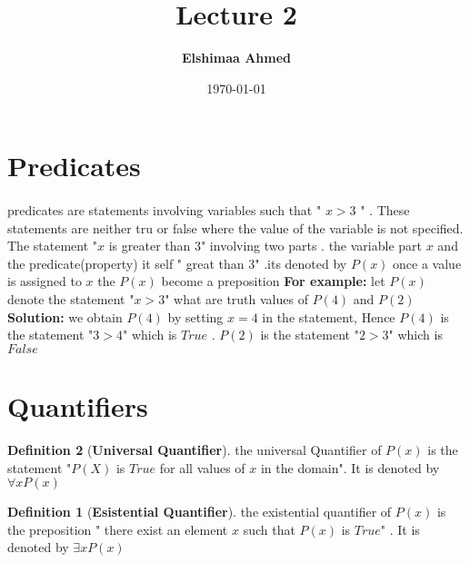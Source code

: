 \documentclass[a4paper]{article}
\begin{document}
\author{\textbf{Elshimaa Ahmed}}
\title{\textbf{Lecture 2}}
\date {\today}
\maketitle
\theoremstyle{definition}
\newtheorem{definition}{Definition}[section]
\section{Predicates}
\paragraph{}
predicates are statements involving variables such that " $x >3$ " . These statements are neither tru or false where the value of the variable is not specified.
The statement "$x$ is greater than 3" involving two parts . the variable part $x$ and the predicate(property) it self " great than 3" .its denoted by $P(x)$  once a value is assigned to $x$ the $P(x)$ become a preposition
\newline
\newline
\textbf{For example:}
\newline
let $P(x)$ denote the statement "$x > 3$" what are truth values of $P(4)$ and $P(2)$
\newline
\newline
\textbf{Solution: } we obtain $P(4)$ by setting $x = 4$ in the statement, Hence $P(4)$  is the statement "$3 > 4$" which is $True$ . $P(2)$ is the statement "$ 2 >3$" which is $False$ 
\section{Quantifiers}
\begin{definition}[\textbf{Universal Quantifier}]
    the universal Quantifier of $P(x)$ is the statement "$P(X)$ is $True$ for all values of $x$ in the domain". It is denoted by $\forall x P(x)$
\begin{definition}[\textbf{Esistential Quantifier}]
    the existential quantifier of $P(x)$ is the preposition " there exist an element $x$ such that $P(x)$ is $True$" . It is denoted by $\exists x P(x)$
\end{definition}    
\end{definition}
\end{document}
